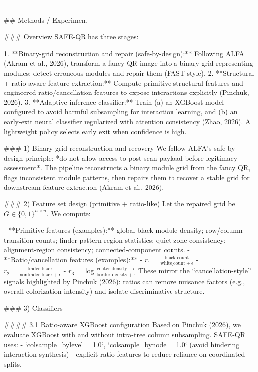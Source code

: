 ---

## Methods / Experiment  

### Overview  
SAFE-QR has three stages:

1. **Binary-grid reconstruction and repair (safe-by-design):** Following ALFA (Akram et al., 2026), transform a fancy QR image into a binary grid representing modules; detect erroneous modules and repair them (FAST-style).  
2. **Structural + ratio-aware feature extraction:** Compute primitive structural features and engineered ratio/cancellation features to expose interactions explicitly (Pinchuk, 2026).  
3. **Adaptive inference classifier:** Train (a) an XGBoost model configured to avoid harmful subsampling for interaction learning, and (b) an early-exit neural classifier regularized with attention consistency (Zhao, 2026). A lightweight policy selects early exit when confidence is high.

### 1) Binary-grid reconstruction and recovery  
We follow ALFA’s safe-by-design principle: *do not allow access to post-scan payload before legitimacy assessment*. The pipeline reconstructs a binary module grid from the fancy QR, flags inconsistent module patterns, then repairs them to recover a stable grid for downstream feature extraction (Akram et al., 2026).

### 2) Feature set design (primitive + ratio-like)  
Let the repaired grid be \(G \in \{0,1\}^{n \times n}\). We compute:

- **Primitive features (examples):** global black-module density; row/column transition counts; finder-pattern region statistics; quiet-zone consistency; alignment-region consistency; connected-component counts.  
- **Ratio/cancellation features (examples):**  
  - \(r_1 = \frac{\text{black\_count}}{\text{white\_count}+\epsilon}\)  
  - \(r_2 = \frac{\text{finder\_black}}{\text{nonfinder\_black}+\epsilon}\)  
  - \(r_3 = \log\frac{\text{center\_density}+\epsilon}{\text{border\_density}+\epsilon}\)  
These mirror the “cancellation-style” signals highlighted by Pinchuk (2026): ratios can remove nuisance factors (e.g., overall colorization intensity) and isolate discriminative structure.

### 3) Classifiers  

#### 3.1 Ratio-aware XGBoost configuration  
Based on Pinchuk (2026), we evaluate XGBoost with and without intra-tree column subsampling. SAFE-QR uses:
- `colsample_bylevel = 1.0`, `colsample_bynode = 1.0` (avoid hindering interaction synthesis)  
- explicit ratio features to reduce reliance on coordinated splits.


